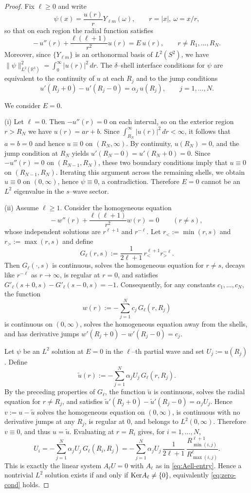 \documentclass[a4paper,11pt]{article}
\numberwithin{equation}{section}
\renewcommand{\ker}{\text{\rm Ker}}
\theoremstyle{definition}
\theoremstyle{remark}
\begin{document}
\begin{proof}
Fix $\ell\ge0$ and write
$$
\psi(x)=\frac{u(r)}{r}Y_{\ell m}(\omega),\qquad r=|x|,\ \omega=x/r,
$$
so that on each region the radial function satisfies
$$
-\,u''(r)+\frac{\ell(\ell+1)}{r^2}u(r)=E\,u(r),
\qquad r\ne R_1,\dots,R_N.
$$
Moreover, since $\{Y_{\ell m}\}$ is an orthonormal basis of $L^2(S^2)$, we have
$\|\psi\|_{L^2(\mathbb R^3)}^2=\int_0^\infty |u(r)|^2\,dr$.
The $\delta$--shell interface conditions for $\psi$ are equivalent to the
continuity of $u$ at each $R_j$ and to the jump conditions
$$
u'(R_j+0)-u'(R_j-0)=\alpha_j\,u(R_j),\qquad j=1,\dots,N.
$$

We consider $E=0$.

{\rm (i)} Let $\ell=0$.
Then $-u''(r)=0$ on each interval, so on the exterior region $r>R_N$ we have
$u(r)=ar+b$.
Since $\int_{R_N}^\infty |u(r)|^2\,dr<\infty$, it follows that $a=b=0$ and hence
$u\equiv0$ on $(R_N,\infty)$.
By continuity, $u(R_N)=0$, and the jump condition at $R_N$ yields
$u'(R_N-0)=u'(R_N+0)=0$.
Since $-u''(r)=0$ on $(R_{N-1},R_N)$, these two boundary conditions imply that
$u\equiv0$ on $(R_{N-1},R_N)$.
Iterating this argument across the remaining shells, we obtain $u\equiv0$ on
$(0,\infty)$, hence $\psi\equiv0$, a contradiction.
Therefore $E=0$ cannot be an $L^2$ eigenvalue in the $s$--wave sector.

{\rm (ii)} Assume $\ell\ge1$.
Consider the homogeneous equation
$$
-\,w''(r)+\frac{\ell(\ell+1)}{r^2}w(r)=0\qquad (r\ne s),
$$
whose independent solutions are $r^{\ell+1}$ and $r^{-\ell}$.
Let $r_<:=\min(r,s)$ and $r_>:=\max(r,s)$ and define
\begin{equation}\label{eq:Green0}
G_\ell(r,s):=\frac{1}{2\ell+1}\,r_<^{\ell+1}r_>^{-\ell}.
\end{equation}
Then $G_\ell(\cdot,s)$ is continuous, solves the homogeneous equation for $r\ne s$,
decays like $r^{-\ell}$ as $r\to\infty$, is regular at $r=0$, and satisfies
$G'_\ell(s+0,s)-G'_\ell(s-0,s)=-1$.
Consequently, for any constants $c_1,\dots,c_N$, the function
$$
w(r):=-\sum_{j=1}^N c_j\,G_\ell(r,R_j)
$$
is continuous on $(0,\infty)$, solves the homogeneous equation away from the
shells, and has derivative jumps
$w'(R_j+0)-w'(R_j-0)=c_j$.

Let $\psi$ be an $L^2$ solution at $E=0$ in the $\ell$--th partial wave and set
$U_j:=u(R_j)$.
Define
$$
\widetilde u(r):=-\sum_{j=1}^N \alpha_j U_j\,G_\ell(r,R_j).
$$
By the preceding properties of $G_\ell$, the function $\widetilde u$ is continuous,
solves the radial equation for $r\ne R_j$, and satisfies
$\widetilde u'(R_j+0)-\widetilde u'(R_j-0)=\alpha_j U_j$.
Hence $v:=u-\widetilde u$ solves the homogeneous equation on $(0,\infty)$,
is continuous with no derivative jumps at any $R_j$, is regular at $0$,
and belongs to $L^2(0,\infty)$.
Therefore $v\equiv0$, and thus $u=\widetilde u$.
Evaluating at $r=R_i$ gives, for $i=1,\dots,N$,
$$
U_i
=
-\sum_{j=1}^N \alpha_j U_j\,G_\ell(R_i,R_j)
=
-\sum_{j=1}^N \alpha_j U_j\,
\frac{1}{2\ell+1}\,
\frac{R_{\min(i,j)}^{\ell+1}}{R_{\max(i,j)}^{\ell}}.
$$
This is exactly the linear system $A_\ell U=0$ with $A_\ell$ as in
\eqref{eq:Aell-entry}. Hence a nontrivial $L^2$ solution exists if and only if
$\ker A_\ell\ne\{0\}$, equivalently \eqref{eq:zero-cond} holds.


\end{proof}
\end{document}
